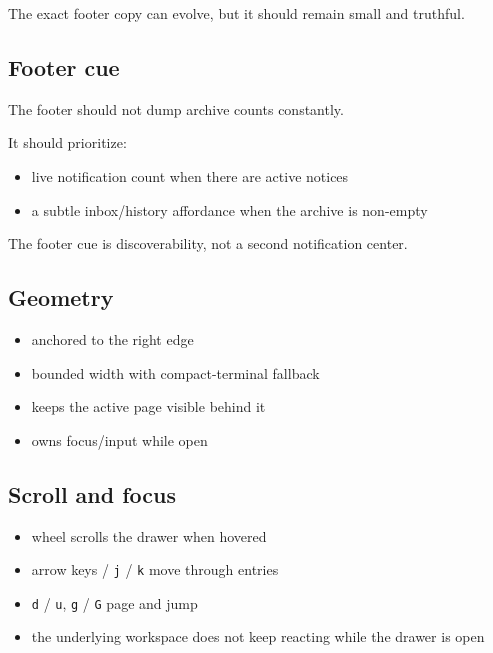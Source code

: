 The exact footer copy can evolve, but it should remain small and truthful.

\subsection{Footer cue}\label{record-053-footer-cue}

The footer should not dump archive counts constantly.

It should prioritize:

\begin{itemize}
\tightlist
\item
  live notification count when there are active notices
\item
  a subtle inbox/history affordance when the archive is non-empty
\end{itemize}

The footer cue is discoverability, not a second notification center.

\subsection{Geometry}\label{record-053-geometry}

\begin{itemize}
\tightlist
\item
  anchored to the right edge
\item
  bounded width with compact-terminal fallback
\item
  keeps the active page visible behind it
\item
  owns focus/input while open
\end{itemize}

\subsection{Scroll and focus}\label{record-053-scroll-and-focus}

\begin{itemize}
\tightlist
\item
  wheel scrolls the drawer when hovered
\item
  arrow keys / \texttt{j} / \texttt{k} move through entries
\item
  \texttt{d} / \texttt{u}, \texttt{g} / \texttt{G} page and jump
\item
  the underlying workspace does not keep reacting while the drawer is open
\end{itemize}

